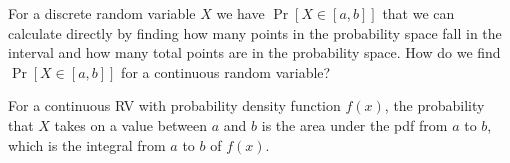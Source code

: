 \question For a discrete random variable $X$ we have $\Pr[X \in [a, b]]$ 
that we can calculate directly by finding how many points in the 
probability space fall in the interval and how many total points are 
in the probability space. How do we find $\Pr[X \in [a, b]]$ for a 
continuous random variable?
\begin{solution}[0.5in]
For a continuous RV with probability density function $f(x)$, the 
probability that $X$ takes on a value between $a$ and $b$ is the area 
under the pdf from $a$ to $b$, which is the integral from $a$ to $b$ 
of $f(x)$.
\end{solution}